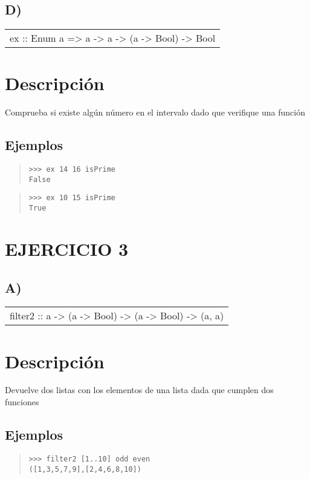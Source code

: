 \subsection{D)}
\begin{haddockdesc}
\item[\begin{tabular}{@{}l}
ex :: Enum a => a -> a -> (a -> Bool) -> Bool
\end{tabular}]
{\haddockbegindoc
\section*{Descripción}
Comprueba si existe algún número en el intervalo dado que verifique una función\par
\subsection*{Ejemplos}
\begin{quote}
{\haddockverb\begin{verbatim}
>>> ex 14 16 isPrime
False

\end{verbatim}}
\end{quote}
\begin{quote}
{\haddockverb\begin{verbatim}
>>> ex 10 15 isPrime
True

\end{verbatim}}
\end{quote}}
\end{haddockdesc}
\section{EJERCICIO 3}
\subsection{A)}
\begin{haddockdesc}
\item[\begin{tabular}{@{}l}
filter2 :: {\char 91}a{\char 93} -> (a -> Bool) -> (a -> Bool) -> ({\char 91}a{\char 93}, {\char 91}a{\char 93})
\end{tabular}]
{\haddockbegindoc
\section*{Descripción}
Devuelve dos listas con los elementos de una lista dada que cumplen dos funciones\par
\subsection*{Ejemplos}
\begin{quote}
{\haddockverb\begin{verbatim}
>>> filter2 [1..10] odd even
([1,3,5,7,9],[2,4,6,8,10])

\end{verbatim}}
\end{quote}}
\end{haddockdesc}
